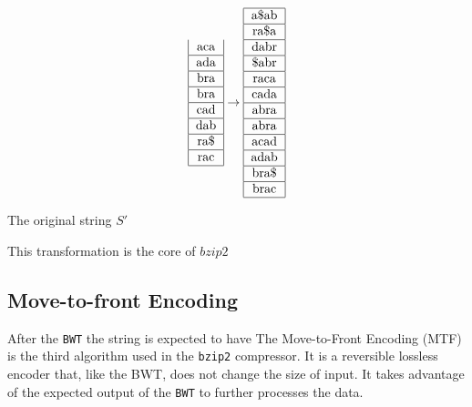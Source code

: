 \documentclass{article}
\begin{document}
\begin{equation*}
\begin{tabular}{|c|}
        aca \\ \hline
        ada \\ \hline
        bra \\ \hline
        bra \\ \hline
        cad \\ \hline
        dab \\ \hline
        ra\$ \\ \hline
        rac \\ \hline
    \end{tabular}
    \rightarrow
    \begin{tabular}{|c|}\hline
        a\$ab \\ \hline
        ra\$a \\ \hline
        dabr \\ \hline
        \$abr \\ \hline
        raca \\ \hline
        cada \\ \hline
        abra \\ \hline
        abra \\ \hline
        acad \\ \hline
        adab \\ \hline
        bra\$ \\ \hline
        brac \\ \hline
    \end{tabular}
\end{equation*}


The original string \(S'\)


This transformation is the core of \(bzip2\)

\subsection{Move-to-front Encoding}
After the \texttt{BWT} the string is expected to have 
The Move-to-Front Encoding (MTF) is the third algorithm used in the \texttt{bzip2} compressor. It is a reversible lossless encoder that, like the BWT, does not change the size of input. It takes advantage of the expected output of the \texttt{BWT} to further processes the data.
\end{document}
